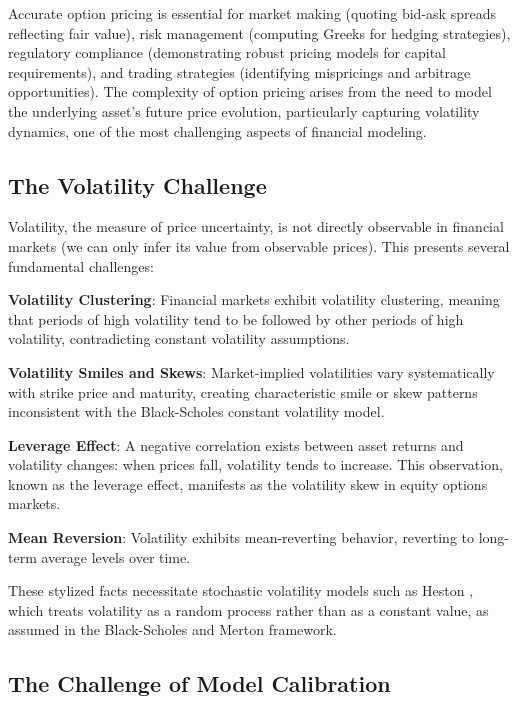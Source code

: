 \documentclass[12pt,a4paper]{article}
\begin{document}
Accurate option pricing is essential for market making (quoting bid-ask spreads reflecting fair value), risk management (computing Greeks for hedging strategies), regulatory compliance (demonstrating robust pricing models for capital requirements), and trading strategies (identifying mispricings and arbitrage opportunities). The complexity of option pricing arises from the need to model the underlying asset's future price evolution, particularly capturing volatility dynamics, one of the most challenging aspects of financial modeling.

\subsection{The Volatility Challenge}

Volatility, the measure of price uncertainty, is not directly observable in financial markets (we can only infer its value from observable prices). This presents several fundamental challenges:

\textbf{Volatility Clustering}: Financial markets exhibit volatility clustering, meaning that periods of high volatility tend to be followed by other periods of high volatility, contradicting constant volatility assumptions.

\textbf{Volatility Smiles and Skews}: Market-implied volatilities vary systematically with strike price and maturity, creating characteristic smile or skew patterns inconsistent with the Black-Scholes constant volatility model.

\textbf{Leverage Effect}: A negative correlation exists between asset returns and volatility changes: when prices fall, volatility tends to increase. This observation, known as the leverage effect, manifests as the volatility skew in equity options markets.

\textbf{Mean Reversion}: Volatility exhibits mean-reverting behavior, reverting to long-term average levels over time.

These stylized facts necessitate stochastic volatility models such as Heston \cite{Heston1993}, which treats volatility as a random process rather than as a constant value, as assumed in the Black-Scholes \cite{BlackScholes1973} and Merton \cite{Merton1973} framework.

\subsection{The Challenge of Model Calibration}
\end{document}
